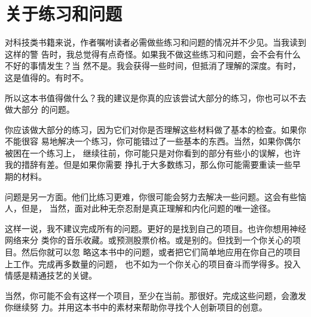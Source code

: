 
\chapter{关于练习和问题}
\label{chap:ExercisesAndProblems}

对科技类书籍来说，作者嘱咐读者必需做些练习和问题的情况并不少见。当我读到这样的警
告时，我总觉得有点奇怪。如果我不做这些练习和问题，会不会有什么不好的事情发生？当
然不是。我会获得一些时间，但抵消了理解的深度。有时，这是值得的。有时不。

所以这本书值得做什么？我的建议是你真的应该尝试大部分的练习，你也可以不去做大部分
的问题。

你应该做大部分的练习，因为它们对你是否理解这些材料做了基本的检查。如果你不能很容
易地解决一个练习，你可能错过了一些基本的东西。当然，如果你偶尔被困在一个练习上，
继续往前，你可能只是对你看到的部分有些小的误解，也许我的措辞有差。但是如果你需要
挣扎于大多数练习，那么你可能需要重读一些早期的材料。

问题是另一方面。他们比练习更难，你很可能会努力去解决一些问题。这会有些恼人，但是，
当然，面对此种无奈忍耐是真正理解和内化问题的唯一途径。

这样一说，我不建议完成所有的问题。更好的是找到自己的项目。也许你想用神经网络来分
类你的音乐收藏。或预测股票价格。或是别的。但找到一个你关心的项目。然后你就可以忽
略这本书中的问题，或者把它们简单地应用在你自己的项目上工作。完成再多数量的问题，
也不如为一个你关心的项目奋斗而学得多。投入情感是精通技艺的关键。

当然，你可能不会有这样一个项目，至少在当前。那很好。完成这些问题，会激发你继续努
力。并用这本书中的素材来帮助你寻找个人创新项目的创意。
